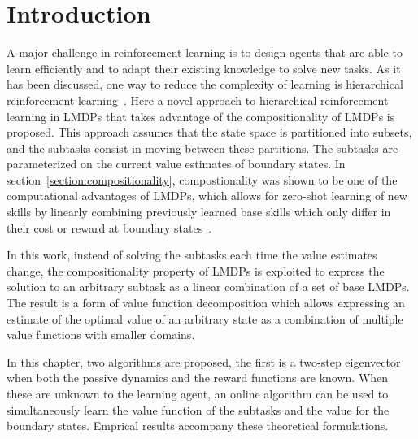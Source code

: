 \section{Introduction}
A major challenge in reinforcement learning is to design agents that are able to learn efficiently and to adapt their existing knowledge to solve new tasks. As it has been discussed, one way to reduce the complexity of learning is hierarchical reinforcement learning~\citep{Sutton1999, Dietterich2000, Barto2003}. Here a novel approach to hierarchical reinforcement learning in LMDPs that takes advantage of the compositionality of LMDPs is proposed. This approach assumes that the state space is partitioned into subsets, and the subtasks consist in moving between these partitions. The subtasks are parameterized on the current value estimates of boundary states. 
In section~\ref{section:compositionality}, compostionality was shown to be one of the computational advantages of LMDPs, which allows for zero-shot learning of new skills by linearly combining previously learned base skills which only differ in their cost or reward at boundary states~\citep{Todorov2009,Silva2009}. 

In this work, instead of solving the subtasks each time the value estimates change, the compositionality property of LMDPs is exploited to express the solution to an arbitrary subtask as a linear combination of a set of base LMDPs. The result is a form of value function decomposition which allows expressing an estimate of the optimal value of an arbitrary state as a combination of multiple value functions with smaller domains.

In this chapter, two algorithms are proposed, the first is a two-step eigenvector when both the passive dynamics and the reward functions are known. When these are unknown to the learning agent, an online algorithm can be used to simultaneously learn the value function of the subtasks and the value for the boundary states. Emprical results accompany these theoretical formulations.
